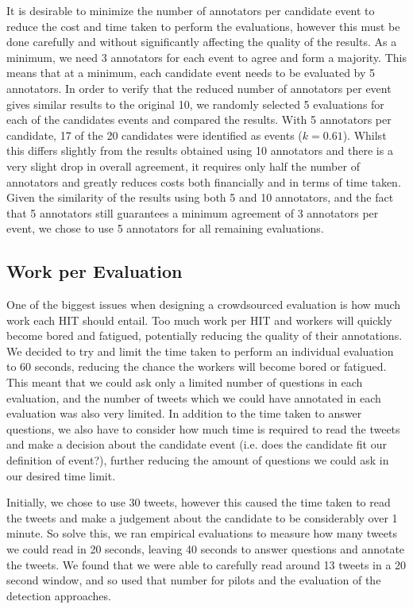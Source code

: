 It is desirable to minimize the number of annotators per candidate event to reduce the cost and time taken to perform the evaluations, however this must be done carefully and without significantly affecting the quality of the results.
As a minimum, we need 3 annotators for each event to agree and form a majority.
This means that at a minimum, each candidate event needs to be evaluated by 5 annotators.
In order to verify that the reduced number of annotators per event gives similar results to the original 10, we randomly selected 5 evaluations for each of the candidates events and compared the results.
With 5 annotators per candidate, 17 of the 20 candidates were identified as events (\(k = 0.61\)).
Whilst this differs slightly from the results obtained using 10 annotators and there is a very slight drop in overall agreement, it requires only half the number of annotators and greatly reduces costs both financially and in terms of time taken.
Given the similarity of the results using both 5 and 10 annotators, and the fact that 5 annotators still guarantees a minimum agreement of 3 annotators per event, we chose to use 5 annotators for all remaining evaluations.

\subsection{Work per Evaluation}
\label{sec:work}
One of the biggest issues when designing a crowdsourced evaluation is how much work each HIT should entail.
Too much work per HIT and workers will quickly become bored and fatigued, potentially reducing the quality of their annotations.
We decided to try and limit the time taken to perform an individual evaluation to 60 seconds, reducing the chance the workers will become bored or fatigued.
This meant that we could ask only a limited number of questions in each evaluation, and the number of tweets which we could have annotated in each evaluation was also very limited.
In addition to the time taken to answer questions, we also have to consider how much time is required to read the tweets and make a decision about the candidate event (i.e. does the candidate fit our definition of event?), further reducing the amount of questions we could ask in our desired time limit.

Initially, we chose to use 30 tweets, however this caused the time taken to read the tweets and make a judgement about the candidate to be considerably over 1 minute.
So solve this, we ran empirical evaluations to measure how many tweets we could read in 20 seconds, leaving 40 seconds to answer questions and annotate the tweets.
We found that we were able to carefully read around 13 tweets in a 20 second window, and so used that number for pilots and the evaluation of the detection approaches.

